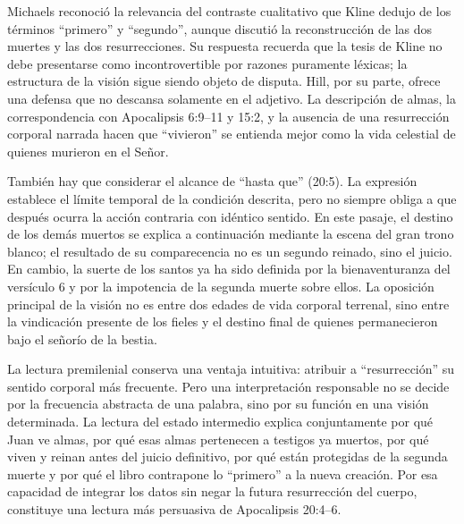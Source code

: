 Michaels reconoció la relevancia del contraste cualitativo que Kline dedujo de los términos \enquote{primero} y \enquote{segundo}, aunque discutió la reconstrucción de las dos muertes y las dos resurrecciones.
Su respuesta recuerda que la tesis de Kline no debe presentarse como incontrovertible por razones puramente léxicas; la estructura de la visión sigue siendo objeto de disputa. \autocite{michaels1976,kline1976}
Hill, por su parte, ofrece una defensa que no descansa solamente en el adjetivo.
La descripción de almas, la correspondencia con Apocalipsis 6:9--11 y 15:2, y la ausencia de una resurrección corporal narrada hacen que \enquote{vivieron} se entienda mejor como la vida celestial de quienes murieron en el Señor. \autocite[53--54 del PDF del curso]{hill2016}

También hay que considerar el alcance de \enquote{hasta que} (20:5).
La expresión establece el límite temporal de la condición descrita, pero no siempre obliga a que después ocurra la acción contraria con idéntico sentido.
En este pasaje, el destino de los demás muertos se explica a continuación mediante la escena del gran trono blanco; el resultado de su comparecencia no es un segundo reinado, sino el juicio.
En cambio, la suerte de los santos ya ha sido definida por la bienaventuranza del versículo 6 y por la impotencia de la segunda muerte sobre ellos.
La oposición principal de la visión no es entre dos edades de vida corporal terrenal, sino entre la vindicación presente de los fieles y el destino final de quienes permanecieron bajo el señorío de la bestia.

La lectura premilenial conserva una ventaja intuitiva: atribuir a \enquote{resurrección} su sentido corporal más frecuente.
Pero una interpretación responsable no se decide por la frecuencia abstracta de una palabra, sino por su función en una visión determinada.
La lectura del estado intermedio explica conjuntamente por qué Juan ve almas, por qué esas almas pertenecen a testigos ya muertos, por qué viven y reinan antes del juicio definitivo, por qué están protegidas de la segunda muerte y por qué el libro contrapone lo \enquote{primero} a la nueva creación.
Por esa capacidad de integrar los datos sin negar la futura resurrección del cuerpo, constituye una lectura más persuasiva de Apocalipsis 20:4--6.
